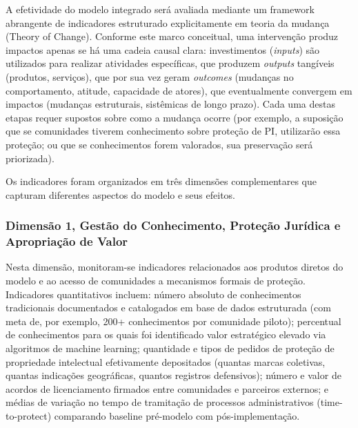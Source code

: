 A efetividade do modelo integrado será avaliada mediante um framework abrangente de indicadores estruturado explicitamente em teoria da mudança (Theory of Change). Conforme este marco conceitual, uma intervenção produz impactos apenas se há uma cadeia causal clara: investimentos (\textit{inputs}) são utilizados para realizar atividades específicas, que produzem \textit{outputs} tangíveis (produtos, serviços), que por sua vez geram \textit{outcomes} (mudanças no comportamento, atitude, capacidade de atores), que eventualmente convergem em impactos (mudanças estruturais, sistêmicas de longo prazo). Cada uma destas etapas requer supostos sobre como a mudança ocorre (por exemplo, a suposição que se comunidades tiverem conhecimento sobre proteção de PI, utilizarão essa proteção; ou que se conhecimentos forem valorados, sua preservação será priorizada).

Os indicadores foram organizados em três dimensões complementares que capturam diferentes aspectos do modelo e seus efeitos.

\subsubsection{Dimensão 1, Gestão do Conhecimento, Proteção Jurídica e Apropriação de Valor}

Nesta dimensão, monitoram-se indicadores relacionados aos produtos diretos do modelo e ao acesso de comunidades a mecanismos formais de proteção. Indicadores quantitativos incluem: número absoluto de conhecimentos tradicionais documentados e catalogados em base de dados estruturada (com meta de, por exemplo, 200+ conhecimentos por comunidade piloto); percentual de conhecimentos para os quais foi identificado valor estratégico elevado via algoritmos de machine learning; quantidade e tipos de pedidos de proteção de propriedade intelectual efetivamente depositados (quantas marcas coletivas, quantas indicações geográficas, quantos registros defensivos); número e valor de acordos de licenciamento firmados entre comunidades e parceiros externos; e médias de variação no tempo de tramitação de processos administrativos (time-to-protect) comparando baseline pré-modelo com pós-implementação.

